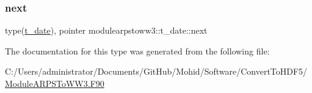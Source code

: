 \mbox{\label{structmodulearpstoww3_1_1t__date_a7fde8a6b10a67b80131929062cbbfcb6}} 
\subsubsection{\texorpdfstring{next}{next}}
{\footnotesize\ttfamily type(\mbox{\hyperlink{structmodulearpstoww3_1_1t__date}{t\+\_\+date}}), pointer modulearpstoww3\+::t\+\_\+date\+::next\hspace{0.3cm}{\ttfamily [private]}}



The documentation for this type was generated from the following file\+:\begin{DoxyCompactItemize}
\item 
C\+:/\+Users/administrator/\+Documents/\+Git\+Hub/\+Mohid/\+Software/\+Convert\+To\+H\+D\+F5/\mbox{\hyperlink{_module_a_r_p_s_to_w_w3_8_f90}{Module\+A\+R\+P\+S\+To\+W\+W3.\+F90}}\end{DoxyCompactItemize}
